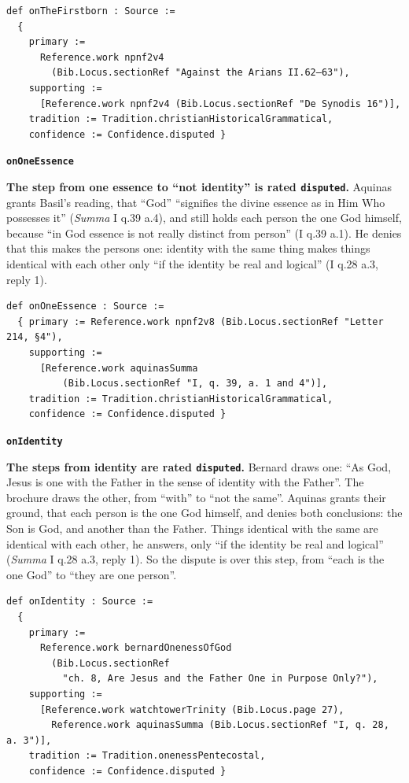 \documentclass[11pt,paper=\testimonypaper,DIV=13,parskip=false]{scrartcl}
\begin{document}
{\small\begin{verbatim}
def onTheFirstborn : Source :=
  {
    primary :=
      Reference.work npnf2v4
        (Bib.Locus.sectionRef "Against the Arians II.62–63"),
    supporting :=
      [Reference.work npnf2v4 (Bib.Locus.sectionRef "De Synodis 16")],
    tradition := Tradition.christianHistoricalGrammatical,
    confidence := Confidence.disputed }
\end{verbatim}}
\par\medskip\noindent\textbf{\texttt{on\allowbreak{}One\allowbreak{}Essence}}\par\nobreak\noindent
\textbf{The step from one essence to “not identity” is rated \texttt{disputed}.} Aquinas grants Basil’s reading, that “God” “signifies the divine essence as in Him Who possesses it” (\emph{Summa} I q.39 a.4), and still holds each person the one God himself, because “in God essence is not really distinct from person” (I q.39 a.1). He denies that this makes the persons one: identity with the same thing makes things identical with each other only “if the identity be real and logical” (I q.28 a.3, reply 1).

{\small\begin{verbatim}
def onOneEssence : Source :=
  { primary := Reference.work npnf2v8 (Bib.Locus.sectionRef "Letter 214, §4"),
    supporting :=
      [Reference.work aquinasSumma
          (Bib.Locus.sectionRef "I, q. 39, a. 1 and 4")],
    tradition := Tradition.christianHistoricalGrammatical,
    confidence := Confidence.disputed }
\end{verbatim}}
\par\medskip\noindent\textbf{\texttt{on\allowbreak{}Identity}}\par\nobreak\noindent
\textbf{The steps from identity are rated \texttt{disputed}.} Bernard draws one: “As God, Jesus is one with the Father in the sense of identity with the Father”. The brochure draws the other, from “with” to “not the same”. Aquinas grants their ground, that each person is the one God himself, and denies both conclusions: the Son is God, and another than the Father. Things identical with the same are identical with each other, he answers, only “if the identity be real and logical” (\emph{Summa} I q.28 a.3, reply 1). So the dispute is over this step, from “each is the one God” to “they are one person”.

{\small\begin{verbatim}
def onIdentity : Source :=
  {
    primary :=
      Reference.work bernardOnenessOfGod
        (Bib.Locus.sectionRef
          "ch. 8, Are Jesus and the Father One in Purpose Only?"),
    supporting :=
      [Reference.work watchtowerTrinity (Bib.Locus.page 27),
        Reference.work aquinasSumma (Bib.Locus.sectionRef "I, q. 28, a. 3")],
    tradition := Tradition.onenessPentecostal,
    confidence := Confidence.disputed }
\end{verbatim}}
\end{document}
